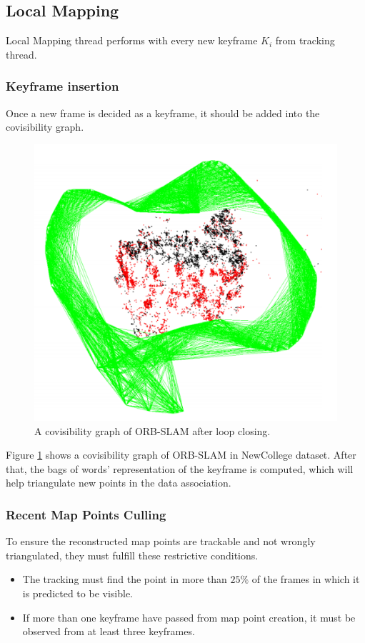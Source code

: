 \documentclass[letterpaper, 10 pt, conference]{ieeeconf}  %
\begin{document}
\subsection{Local Mapping}
Local Mapping thread performs with every new keyframe $K_i$ from tracking thread.

\subsubsection{Keyframe insertion}
Once a new frame is decided as a keyframe, it should be added into the covisibility graph. 

%
\begin{figure}[!htbp]%
\centering
\includegraphics[scale=0.25]{./images/covisibility_graph}
\caption{A covisibility graph of ORB-SLAM after loop closing. \cite{ORBSLAM}}
\label{covisibility_graph}
\end{figure}
%
Figure \ref{covisibility_graph} shows a covisibility graph of ORB-SLAM in NewCollege dataset. After that, the bags of words' representation of the keyframe is computed, which will help triangulate new points in the data association.

\subsubsection{Recent Map Points Culling}
\label{Mappoint_culling}
To ensure the reconstructed map points are trackable and not wrongly triangulated, they must fulfill these restrictive conditions.
%
\begin{itemize}
\item The tracking must find the point in more than $25\%$ of the frames in which it is predicted to be visible.
\item If more than one keyframe  have passed from map point creation, it must be observed from at least three keyframes.
\end{itemize}
%
\end{document}
